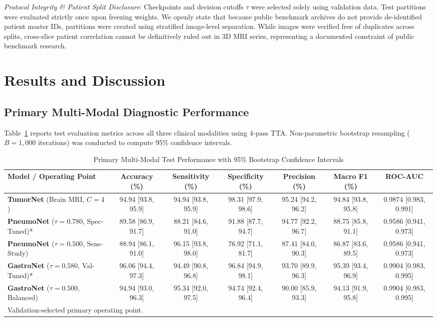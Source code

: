 \documentclass[conference]{IEEEtran}
\begin{document}
\textit{Protocol Integrity \& Patient Split Disclosure}: Checkpoints and decision cutoffs $\tau$ were selected solely using validation data. Test partitions were evaluated strictly once upon freezing weights. We openly state that because public benchmark archives \cite{kermany2018identifying, afshar2019capsule} do not provide de-identified patient master IDs, partitions were created using stratified image-level separation. While images were verified free of duplicates across splits, cross-slice patient correlation cannot be definitively ruled out in 3D MRI series, representing a documented constraint of public benchmark research.

\section{Results and Discussion}
\subsection{Primary Multi-Modal Diagnostic Performance}
Table~\ref{tab:main_results} reports test evaluation metrics across all three clinical modalities using 4-pass TTA. Non-parametric bootstrap resampling ($B=1{,}000$ iterations) was conducted to compute 95\% confidence intervals.

\begin{table}[t]
\caption{Primary Multi-Modal Test Performance with 95\% Bootstrap Confidence Intervals}
\label{tab:main_results}
\centering
\begin{tabular}{lcccccc}
\toprule
\textbf{Model / Operating Point} & \textbf{Accuracy (\%)} & \textbf{Sensitivity (\%)} & \textbf{Specificity (\%)} & \textbf{Precision (\%)} & \textbf{Macro F1 (\%)} & \textbf{ROC-AUC} \\
\midrule
\textbf{TumorNet} (Brain MRI, $C=4$) & 94.94 [93.8, 95.9] & 94.94 [93.8, 95.9] & 98.31 [97.9, 98.6] & 95.24 [94.2, 96.2] & 94.84 [93.8, 95.8] & 0.9874 [0.983, 0.991] \\
\textbf{PneumoNet} ($\tau=0.780$, Spec-Tuned)* & 89.58 [86.9, 91.7] & 88.21 [84.6, 91.0] & 91.88 [87.7, 94.7] & 94.77 [92.2, 96.7] & 88.75 [85.8, 91.1] & 0.9586 [0.941, 0.973] \\
\textbf{PneumoNet} ($\tau=0.500$, Sens-Study) & 88.94 [86.1, 91.0] & 96.15 [93.8, 98.0] & 76.92 [71.1, 81.7] & 87.41 [84.0, 90.3] & 86.87 [83.6, 89.5] & 0.9586 [0.941, 0.973] \\
\textbf{GastroNet} ($\tau=0.580$, Val-Tuned)* & 96.06 [94.4, 97.3] & 94.49 [90.8, 96.8] & 96.84 [94.9, 98.1] & 93.70 [89.9, 96.3] & 95.39 [93.4, 96.9] & 0.9904 [0.983, 0.995] \\
\textbf{GastroNet} ($\tau=0.500$, Balanced) & 94.94 [93.0, 96.3] & 95.34 [92.0, 97.5] & 94.74 [92.4, 96.4] & 90.00 [85.9, 93.3] & 94.13 [91.9, 95.8] & 0.9904 [0.983, 0.995] \\
\bottomrule
\multicolumn{7}{l}{\footnotesize *Validation-selected primary operating point.}
\end{tabular}
\end{table}
\end{document}

